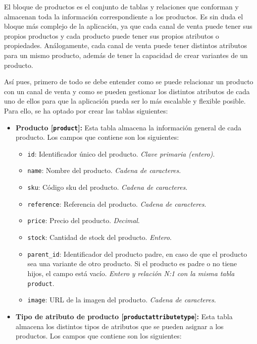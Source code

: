 El bloque de productos es el conjunto de tablas y relaciones que conforman y almacenan toda la información correspondiente a los productos. Es sin duda el bloque más complejo de la aplicación, ya que cada canal de venta puede tener sus propios productos y cada producto puede tener sus propios atributos o propiedades. Análogamente, cada canal de venta puede tener distintos atributos para un mismo producto, además de tener la capacidad de crear variantes de un producto.

Así pues, primero de todo se debe entender como se puede relacionar un producto con un canal de venta y como se pueden gestionar los distintos atributos de cada uno de ellos para que la aplicación pueda ser lo más escalable y flexible posible. Para ello, se ha optado por crear las tablas siguientes:

\begin{itemize}
    \item \textbf{Producto [\texttt{product}]:} Esta tabla almacena la información general de cada producto. Los campos que contiene son los siguientes:
          \begin{itemize}
              \item \texttt{id}: Identificador único del producto. \textit{Clave primaria (entero)}.
              \item \texttt{name}: Nombre del producto. \textit{Cadena de caracteres}.
              \item \texttt{sku}: Código \gls{sku} del producto. \textit{Cadena de caracteres}.
              \item \texttt{reference}: Referencia del producto. \textit{Cadena de caracteres}.
              \item \texttt{price}: Precio del producto. \textit{Decimal}.
              \item \texttt{stock}: Cantidad de stock del producto. \textit{Entero}.
              \item \texttt{parent\_id}: Identificador del producto padre, en caso de que el producto sea una variante de otro producto. Si el producto es padre o no tiene hijos, el campo está vacío. \textit{Entero y relación N:1 con la misma tabla} \texttt{product}.
              \item \texttt{image}: URL de la imagen del producto. \textit{Cadena de caracteres}.
          \end{itemize}
    \item \textbf{Tipo de atributo de producto [\texttt{productattributetype}]:} Esta tabla almacena los distintos tipos de atributos que se pueden asignar a los productos. Los campos que contiene son los siguientes:

\end{itemize}
